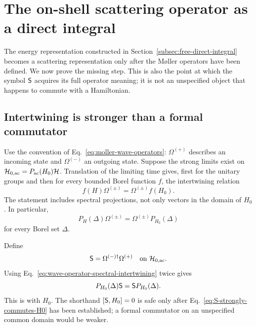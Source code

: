 \section{The on-shell scattering operator as a direct integral}
\label{sec:scattering-direct-integral}

The energy representation constructed in
Section~\ref{subsec:free-direct-integral} becomes a scattering representation
only after the M{\o}ller operators have been defined.  We now prove the missing
step.  This is also the point at which the symbol $\mathsf{S}$ acquires its
full operator meaning; it is not an unspecified object that happens to
commute with a Hamiltonian.

\subsection{Intertwining is stronger than a formal commutator}

Use the convention of Eq.~\eqref{eq:moller-wave-operators}:
$\Omega^{(+)}$ describes an incoming state and $\Omega^{(-)}$ an outgoing
state.  Suppose the strong limits exist on
$\mathcal{H}_{0,\mathrm{ac}}=P_{\mathrm{ac}}(H_0)\mathcal{H}$.  Translation of the limiting
time gives, first for the unitary groups and then for every bounded Borel
function $f$, the intertwining relation
\begin{equation}
  f(H)\Omega^{(\pm)}
  =\Omega^{(\pm)}f(H_0).
  \label{eq:wave-operator-borel-intertwining}
\end{equation}
The statement includes spectral projections, not only vectors in the domain
of $H_0$.  In particular,
\begin{equation}
  P_H(\Delta)\Omega^{(\pm)}
  =\Omega^{(\pm)}P_{H_0}(\Delta)
  \label{eq:wave-operator-spectral-intertwining}
\end{equation}
for every Borel set $\Delta$.

Define
\begin{equation}
  \mathsf{S}=\Omega^{(-)\dagger}\Omega^{(+)}
  \quad\text{on }\mathcal{H}_{0,\mathrm{ac}}.
  \label{eq:scattering-operator-direct-integral}
\end{equation}
Using Eq.~\eqref{eq:wave-operator-spectral-intertwining} twice gives
\begin{equation}
  P_{H_0}(\Delta)\mathsf{S}
  =\mathsf{S} P_{H_0}(\Delta).
  \label{eq:S-strongly-commutes-H0}
\end{equation}
This is  with $H_0$.  The shorthand
$[\mathsf{S},H_0]=0$ is safe only after
Eq.~\eqref{eq:S-strongly-commutes-H0} has been established; a formal
commutator on an unspecified common domain would be weaker.

